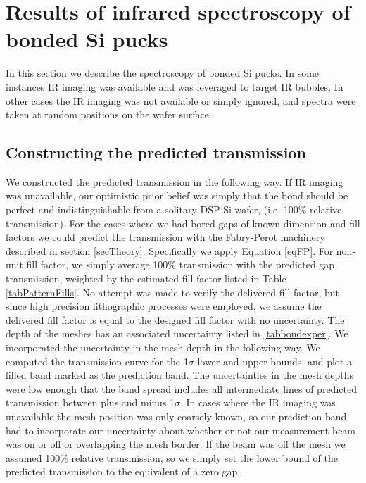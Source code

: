 \documentclass[osajnl,preprint,showpacs,superscriptaddress,12pt]{revtex4-1} %
\begin{document}
\section{Results of infrared spectroscopy of bonded Si pucks}
\label{secResults}
In this section we describe the spectroscopy of bonded Si pucks.  In some instances IR imaging was available and was leveraged to target IR bubbles.  In other cases the IR imaging was not available or simply ignored, and spectra were taken at random positions on the wafer surface.  

\subsection{Constructing the predicted transmission}
We constructed the predicted transmission in the following way.  If IR imaging was unavailable, our optimistic prior belief was simply that the bond should be perfect and indistinguishable from a solitary DSP Si wafer, (i.e. 100\% relative transmission).  For the cases where we had bored gaps of known dimension and fill factors we could predict the transmission with the Fabry-Perot machinery described in section \ref{secTheory}.  Specifically we apply Equation \ref{eqFP}.  For non-unit fill factor, we simply average 100\% transmission with the predicted gap transmission, weighted by the estimated fill factor listed in Table \ref{tabPatternFills}.  No attempt was made to verify the delivered fill factor, but since high precision lithographic processes were employed, we assume the delivered fill factor is equal to the designed fill factor with no uncertainty.  The depth of the meshes has an associated uncertainty listed in \ref{tabbondexper}.  We incorporated the uncertainty in the mesh depth in the following way.  We computed the transmission curve for the 1$\sigma$ lower and upper bounds, and plot a filled band marked as the prediction band.  The uncertainties in the mesh depths were low enough that the band spread includes all intermediate lines of predicted transmission between plus and minus 1$\sigma$.  In cases where the IR imaging was unavailable the mesh position was only coarsely known, so our prediction band had to incorporate our uncertainty about whether or not our measurement beam was on or off or overlapping the mesh border.  If the beam was off the mesh we assumed 100\% relative transmission, so we simply set the lower bound of the predicted transmission to the equivalent of a zero gap.  
\end{document}
